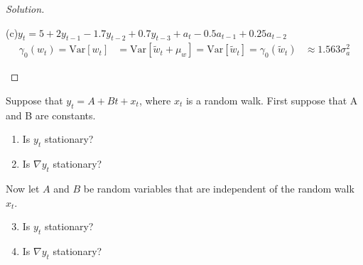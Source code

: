 \documentclass[UTF8,a4paper,14pt]{ctexart}
\newcommand{\E}{{\rm I\kern-.3em E}}
\newcommand{\Var}{\mathrm{Var}}
\newenvironment{solution}
  {\renewcommand\qedsymbol{$\blacksquare$}\begin{proof}[Solution]}
  {\end{proof}}
\theoremstyle{definition}
\theoremstyle{remark}
\begin{document}
\begin{solution}
\begin{mybox}{(c)\(y_t = 5+2y_{t-1}-1.7y_{t-2}+0.7y_{t-3}+a_t-0.5 a_{t-1}+0.25 a_{t-2}\)}
      \begin{equation*}
        \begin{aligned}
          \gamma_0(w_t) = \Var[w_t]
          &= \Var[{\tilde{w}_t}+\mu_w]
          = \Var[{\tilde{w}_t}]=\gamma_0({\tilde{w}_t})
          &\approx 1.563\sigma_a^2
        \end{aligned}
      \end{equation*}      
  \end{mybox}
\end{solution}

\pagebreak
\begin{Problem}{}
  Suppose that \(y_t = A+Bt+x_t\), where \(x_t\)
  is a random walk. First suppose that A and B are constants.
  \begin{enumerate}[label=(\alph*), ref=\alph*]
    \item Is \(y_t\) stationary?
    \item Is \(\nabla y_t\) stationary?
  \end{enumerate}
  Now let \(A\) and \(B\) be random variables that are independent of the random walk \(x_t\).
  \begin{enumerate}[label=(\alph*), ref=\alph*]\setcounter{enumi}{2}
    \item Is \(y_t\) stationary?
    \item Is \(\nabla y_t\) stationary?
  \end{enumerate}

\end{Problem}
\end{document}
